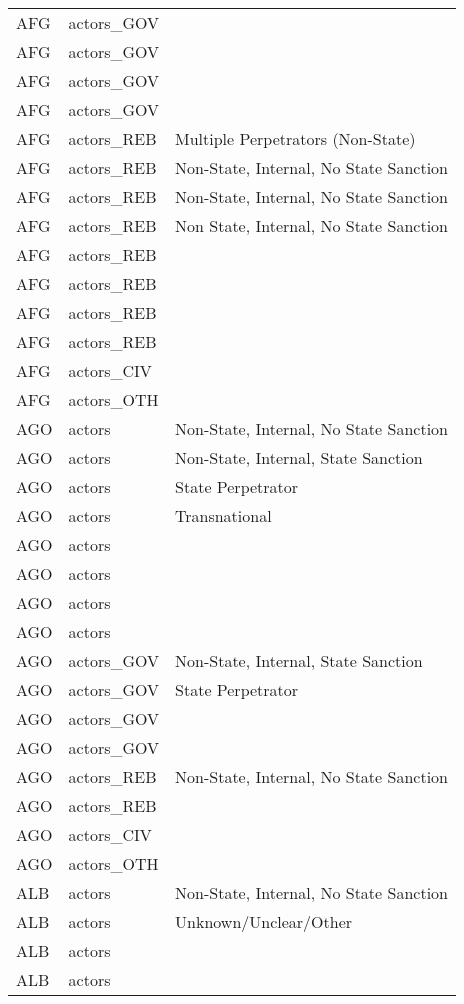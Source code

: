 \begin{table}[ht]
\begin{tabular}{lll}
  AFG & actors\_GOV &  \\ 
  AFG & actors\_GOV &  \\ 
  AFG & actors\_GOV &  \\ 
  AFG & actors\_GOV &  \\ 
  AFG & actors\_REB & Multiple Perpetrators (Non-State) \\ 
  AFG & actors\_REB & Non-State, Internal, No State Sanction \\ 
  AFG & actors\_REB & Non-State, Internal, No State Sanction \\ 
  AFG & actors\_REB & Non State, Internal, No State Sanction \\ 
  AFG & actors\_REB &  \\ 
  AFG & actors\_REB &  \\ 
  AFG & actors\_REB &  \\ 
  AFG & actors\_REB &  \\ 
  AFG & actors\_CIV &  \\ 
  AFG & actors\_OTH &  \\ 
  AGO & actors & Non-State, Internal, No State Sanction \\ 
  AGO & actors & Non-State, Internal, State Sanction \\ 
  AGO & actors & State Perpetrator \\ 
  AGO & actors & Transnational \\ 
  AGO & actors &  \\ 
  AGO & actors &  \\ 
  AGO & actors &  \\ 
  AGO & actors &  \\ 
  AGO & actors\_GOV & Non-State, Internal, State Sanction \\ 
  AGO & actors\_GOV & State Perpetrator \\ 
  AGO & actors\_GOV &  \\ 
  AGO & actors\_GOV &  \\ 
  AGO & actors\_REB & Non-State, Internal, No State Sanction \\ 
  AGO & actors\_REB &  \\ 
  AGO & actors\_CIV &  \\ 
  AGO & actors\_OTH &  \\ 
  ALB & actors & Non-State, Internal, No State Sanction \\ 
  ALB & actors & Unknown/Unclear/Other \\ 
  ALB & actors &  \\ 
  ALB & actors &  \\ 

\end{tabular}
\end{table}
